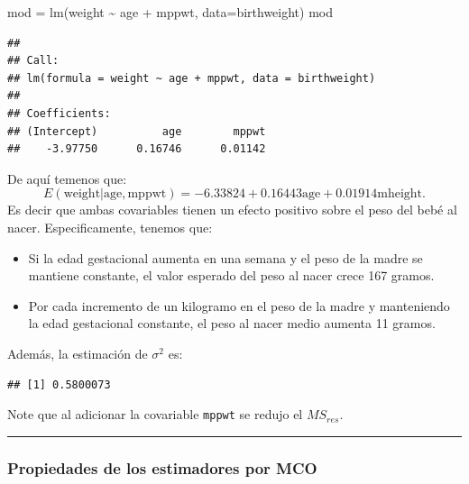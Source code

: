 \documentclass[
]{article}
\newenvironment{Shaded}{\begin{snugshade}}{\end{snugshade}}
\newcommand{\AttributeTok}[1]{\textcolor[rgb]{0.77,0.63,0.00}{#1}}
\newcommand{\DecValTok}[1]{\textcolor[rgb]{0.00,0.00,0.81}{#1}}
\newcommand{\FunctionTok}[1]{\textcolor[rgb]{0.00,0.00,0.00}{#1}}
\newcommand{\NormalTok}[1]{#1}
\newcommand{\OtherTok}[1]{\textcolor[rgb]{0.56,0.35,0.01}{#1}}
\newcommand{\SpecialCharTok}[1]{\textcolor[rgb]{0.00,0.00,0.00}{#1}}
\providecommand{\tightlist}{%
  \setlength{\itemsep}{0pt}\setlength{\parskip}{0pt}}
\begin{document}
\begin{Shaded}
\begin{Highlighting}[]
\NormalTok{mod }\OtherTok{=} \FunctionTok{lm}\NormalTok{(weight }\SpecialCharTok{\textasciitilde{}}\NormalTok{ age }\SpecialCharTok{+}\NormalTok{ mppwt, }\AttributeTok{data=}\NormalTok{birthweight)}
\NormalTok{mod}
\end{Highlighting}
\end{Shaded}

\begin{verbatim}
## 
## Call:
## lm(formula = weight ~ age + mppwt, data = birthweight)
## 
## Coefficients:
## (Intercept)          age        mppwt  
##    -3.97750      0.16746      0.01142
\end{verbatim}

De aquí temenos que:
\[
E(\mbox{weight} | \mbox{age}, \mbox{mppwt})= -6.33824+0.16443\mbox{age}+0.01914\mbox{mheight}.
\]
Es decir que ambas covariables tienen un efecto positivo sobre el peso del bebé al nacer. Especificamente, tenemos que:

\begin{itemize}
\tightlist
\item
  Si la edad gestacional aumenta en una semana y el peso de la madre se mantiene constante, el valor esperado del peso al nacer crece 167 gramos.
\item
  Por cada incremento de un kilogramo en el peso de la madre y manteniendo la edad gestacional constante, el peso al nacer medio aumenta 11 gramos.
\end{itemize}

Además, la estimación de \(\sigma^{2}\) es:

\begin{Shaded}
\end{Shaded}

\begin{verbatim}
## [1] 0.5800073
\end{verbatim}

Note que al adicionar la covariable \texttt{mppwt} se redujo el \(MS_{res}\).

\rule{\textwidth}{0.4pt}

\hypertarget{propiedades-de-los-estimadores-por-mco-1}{%
\subsubsection{Propiedades de los estimadores por MCO}\label{propiedades-de-los-estimadores-por-mco-1}}
\end{document}
